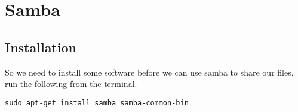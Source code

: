 \chapter{Samba}
\label{chp:samba}

\section{Installation}
\label{sec:samba:install}

So we need to install some software before we can use samba to share our files,  run the following from the terminal.

\begin{lstlisting}
sudo apt-get install samba samba-common-bin
\end{lstlisting}

